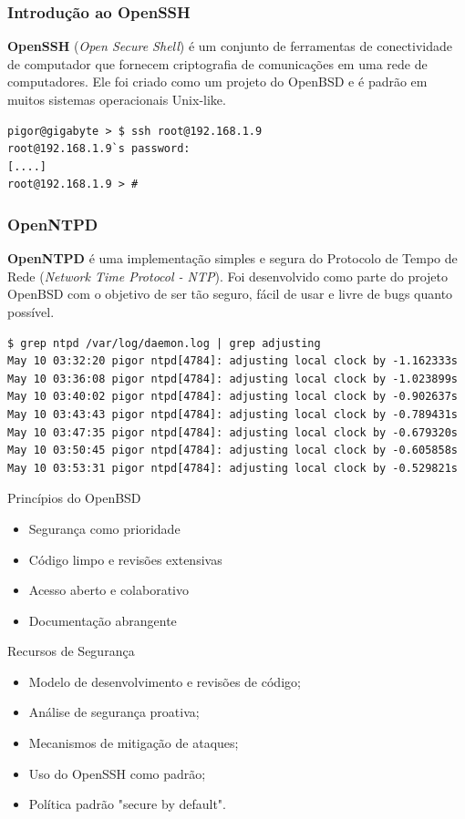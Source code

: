 \documentclass[9pt,xcolor=table]{beamer}
\begin{document}
\begin{frame}[fragile]
\frametitle{Introdução ao OpenSSH}
\textbf{OpenSSH} (\textit{Open Secure Shell}) é um conjunto de ferramentas de conectividade de computador que fornecem criptografia de comunicações em uma rede de computadores. Ele foi criado como um projeto do OpenBSD e é padrão em muitos sistemas operacionais Unix-like.
\vspace{0.5cm}
\begin{lstlisting}
pigor@gigabyte > $ ssh root@192.168.1.9
root@192.168.1.9`s password:
[....]
root@192.168.1.9 > #
\end{lstlisting}
\end{frame}
\begin{frame}[fragile]
\frametitle{OpenNTPD}
\justifying
\textbf{OpenNTPD} é uma implementação simples e segura do Protocolo de Tempo de Rede (\textit{Network Time Protocol - NTP}). Foi desenvolvido como parte do projeto OpenBSD com o objetivo de ser tão seguro, fácil de usar e livre de bugs quanto possível.
\vspace{0.5cm}
\begin{lstlisting}
$ grep ntpd /var/log/daemon.log | grep adjusting
May 10 03:32:20 pigor ntpd[4784]: adjusting local clock by -1.162333s
May 10 03:36:08 pigor ntpd[4784]: adjusting local clock by -1.023899s
May 10 03:40:02 pigor ntpd[4784]: adjusting local clock by -0.902637s
May 10 03:43:43 pigor ntpd[4784]: adjusting local clock by -0.789431s
May 10 03:47:35 pigor ntpd[4784]: adjusting local clock by -0.679320s
May 10 03:50:45 pigor ntpd[4784]: adjusting local clock by -0.605858s
May 10 03:53:31 pigor ntpd[4784]: adjusting local clock by -0.529821s
\end{lstlisting}
\end{frame}
\begin{frame}{Princípios do OpenBSD}
  \begin{itemize}
    \item Segurança como prioridade
    \item Código limpo e revisões extensivas
    \item Acesso aberto e colaborativo
    \item Documentação abrangente
  \end{itemize}
\end{frame}
\begin{frame}{Recursos de Segurança}
  \begin{itemize}
    \item Modelo de desenvolvimento e revisões de código;
    \item Análise de segurança proativa;
    \item Mecanismos de mitigação de ataques;
    \item Uso do OpenSSH como padrão;
    \item Política padrão "secure by default".
  \end{itemize}
\end{frame}
\end{document}
